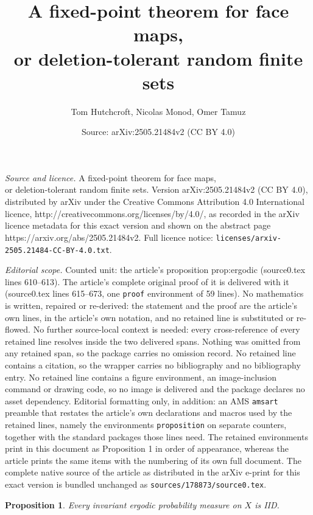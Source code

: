 \documentclass[10pt,a4paper]{amsart}
\title{A fixed-point theorem for face maps,\\ or deletion-tolerant random finite sets}
\author{Tom Hutchcroft, Nicolas Monod, Omer Tamuz}
\date{Source: arXiv:2505.21484v2 (CC BY 4.0)}
\newtheorem{proposition}{Proposition}
\begin{document}
\maketitle

\noindent\emph{Source and licence.} A fixed-point theorem for face maps,\\ or deletion-tolerant random finite sets. Version arXiv:2505.21484v2 (CC BY 4.0), distributed by arXiv under the Creative Commons Attribution 4.0 International licence, http://creativecommons.org/licenses/by/4.0/, as recorded in the arXiv licence metadata for this exact version and shown on the abstract page https://arxiv.org/abs/2505.21484v2. Full licence notice: \texttt{licenses/arxiv-2505.21484-CC-BY-4.0.txt}.\par\smallskip

\noindent\textit{Editorial scope.} Counted unit: the article's proposition prop:ergodic (source0.tex lines 610--613). The article's complete original proof of it is delivered with it (source0.tex lines 615--673, one \texttt{proof} environment of 59 lines). No mathematics is written, repaired or re-derived: the statement and the proof are the article's own lines, in the article's own notation, and no retained line is substituted or re-flowed.  No further source-local context is needed: every cross-reference of every retained line resolves inside the two delivered spans.  Nothing was omitted from any retained span, so the package carries no omission record.  No retained line contains a citation, so the wrapper carries no bibliography and no bibliography entry.  No retained line contains a figure environment, an image-inclusion command or drawing code, so no image is delivered and the package declares no asset dependency.  Editorial formatting only, in addition: an AMS \texttt{amsart} preamble that restates the article's own declarations and macros used by the retained lines, namely the environments \texttt{proposition} on separate counters, together with the standard packages those lines need.  The retained environments print in this document as Proposition 1 in order of appearance, whereas the article prints the same items with the numbering of its own full document.  The complete native source of the article as distributed in the arXiv e-print for this exact version is bundled unchanged as \texttt{sources/178873/source0.tex}.
\begin{proposition}
    \label{prop:ergodic}
    Every invariant ergodic probability measure on $X$ is IID.
\end{proposition}
\end{document}
